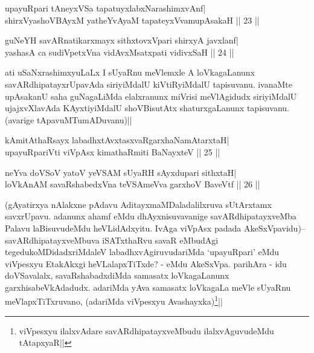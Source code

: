 \begin{shl}
upayuRpari tAneyxVSa tapatuyxlabxNarashimxvAnf| \\
shirxVyashoVBAyxM yatheYvAyaM tapateyxVvamupAsakaH \hfill ||  23 ||
\end{shl}

\begin{shl}
guNeYH savARnatikarxmayx sithxtovxVpari shirxyA javxlanf| \\
yashasA ca sudiVpetxVna vidAvxMsatxpati vidivxSaH \hfill ||  24 || 
\end{shl}

\begin{artha} 
ati uSaNxrashimxyuLaLx I sUyaRnu meVlemxle A loVkagaLanunx 
savARdhipatayxrUpavAda siriyiMdalU kiVtiRyiMdalU tapisuvanu. ivanaMte 
upAsakanU saha guNagaLiMda elalxranunx miVrisi meVlAgidudx siriyiMdalU 
ujajxvXlavAda KAyxtiyiMdalU shoVBisutAtx shaturxgaLanunx tapisuvanu. 
(avarige tApavuMTumADuvanu)||
\end{artha}


\begin{shl}
kAmitAthaRsayx labadhxtAvxtasxvaRgarxhaNamAtarxtaH| \\
upayuRpariVti viVpAsx kimathaRmiti BaNayxteV \hfill ||  25 || 
\end{shl}

\begin{shl}
neYva doVSoV yatoV yeVSAM sUyaRH sAyxdupari sithxtaH| \\
loVkAnAM savaRshabedxVna teVSAmeVva garxhoV BaveVtf \hfill ||  26 || 
\end{shl}

\begin{artha} 
(gAyatirxya nAlakxne pAdavu AditayxmaMDaladalilxruva sUtArxtamx 
savxrUpavu. adanunx ahamf eMdu dhAyxnisuvavanige savARdhipatayxveMba 
Palavu laBisuvudeMdu heVLidAdxyitu. IvAga viVpAsx padada 
AkeSxVpavidu)-- savARdhipatayxveMbuva iSATxthaRvu savaR eMbudAgi 
tegedukoMDidadxriMdaleV labadhxvAgiruvudariMda `upayuRpari' eMdu 
viVpesxyu EtakAkxgi heVLalapxTiTxde? - eMdu AkeSxVpa. parihAra - idu 
doVSavalalx, savaRshabadxdiMda samasatx loVkagaLanunx 
garxhisabeVkAdadudx. adariMda yAva samasatx loVkagaLa meVle sUyaRnu 
meVlapxTiTxruvano, (adariMda viVpesxyu 
Avashayxka)\footnote[1]{viVpesxyu ilalxvAdare savARdhipatayxveMbudu 
ilalxvAguvudeMdu tAtapxyaR||}||
\end{artha}

